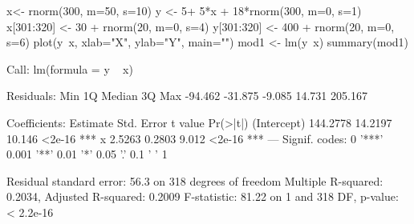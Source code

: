 \begin{Schunk}
\begin{Sinput}
 x<- rnorm(300, m=50, s=10)
 y <- 5+ 5*x + 18*rnorm(300, m=0, s=1)
 x[301:320] <- 30 + rnorm(20, m=0, s=4)
 y[301:320] <- 400 + rnorm(20, m=0, s=6)
 plot(y~x, xlab="X", ylab="Y", main="")
 mod1 <- lm(y~x)
 summary(mod1)
\end{Sinput}
\begin{Soutput}
Call:
lm(formula = y ~ x)

Residuals:
    Min      1Q  Median      3Q     Max 
-94.462 -31.875  -9.085  14.731 205.167 

Coefficients:
            Estimate Std. Error t value Pr(>|t|)    
(Intercept) 144.2778    14.2197  10.146   <2e-16 ***
x             2.5263     0.2803   9.012   <2e-16 ***
---
Signif. codes:  0 '***' 0.001 '**' 0.01 '*' 0.05 '.' 0.1 ' ' 1

Residual standard error: 56.3 on 318 degrees of freedom
Multiple R-squared:  0.2034,	Adjusted R-squared:  0.2009 
F-statistic: 81.22 on 1 and 318 DF,  p-value: < 2.2e-16
\end{Soutput}
\end{Schunk}
